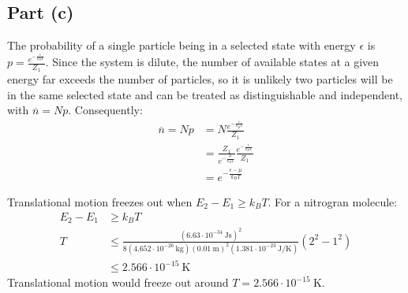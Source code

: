 \documentclass{article}
\begin{document}
\subsection*{Part (c)}
The probability of a single particle being in a selected state with energy $\epsilon$ is $p = \frac{e^{-\frac{\epsilon}{k_BT}}}{Z_1}$. Since the system is dilute, the number of available states at a given energy far exceeds the number of particles, so it is unlikely two particles will be in the same selected state and can be treated as distinguishable and independent, with $\overline{n} = Np$. Consequently:
\begin{equation}
    \begin{split}
        \overline{n} = Np & = N\frac{e^{-\frac{\epsilon}{k_BT}}}{Z_1} \\
        & = \frac{Z_1}{e^{-\frac{\mu}{k_BT}}}\frac{e^{-\frac{\epsilon}{k_BT}}}{Z_1} \\
        & = e^{-\frac{\epsilon - \mu}{k_BT}}
    \end{split}
\end{equation}

\clearpage

Translational motion freezes out when $E_2 - E_1 \geq k_BT$. For a nitrogran molecule:
\begin{equation}
    \begin{split}
        E_2 - E_1 & \geq k_BT \\
        T & \leq \frac{(6.63 \cdot 10^{-34}~\unit{\joule\second})^2}{8(4.652 \cdot 10^{-26}~\unit{\kilo\gram})(0.01~\unit{\meter})^2(1.381 \cdot 10^{-23}~\unit{\joule\per\kelvin})}(2^2 - 1^2) \\
        & \leq 2.566 \cdot 10^{-15}~\unit{\kelvin}
    \end{split}
\end{equation}
Translational motion would freeze out around $T = 2.566 \cdot 10^{-15}~\unit{\kelvin}$.

\clearpage

\end{document}
